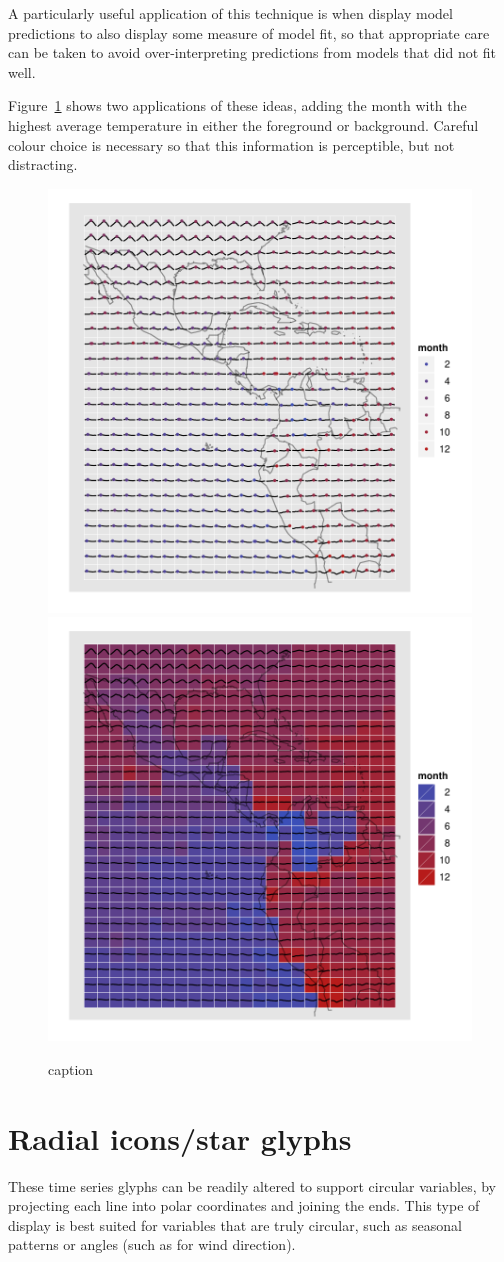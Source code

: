 \documentclass[oneside]{article}
\begin{document}
A particularly useful application of this technique is when display model predictions to also display some measure of model fit, so that appropriate care can be taken to avoid over-interpreting predictions from models that did not fit well.

Figure~\ref{fig:ref-adv} shows two applications of these ideas, adding the month with the highest average temperature in either the foreground or background. Careful colour choice is necessary so that this information is perceptible, but not distracting.

\begin{figure}[htbp]
  \centering
    \includegraphics[width=0.5\linewidth]{ref-max-1}%
    \includegraphics[width=0.5\linewidth]{ref-max-2}
  \caption{caption}
  \label{fig:ref-adv}
\end{figure}


\section{Radial icons/star glyphs}

These time series glyphs can be readily altered to support circular variables, by projecting each line into polar coordinates and joining the ends. This type of display is best suited for variables that are truly circular, such as seasonal patterns or angles (such as for wind direction).
\end{document}

